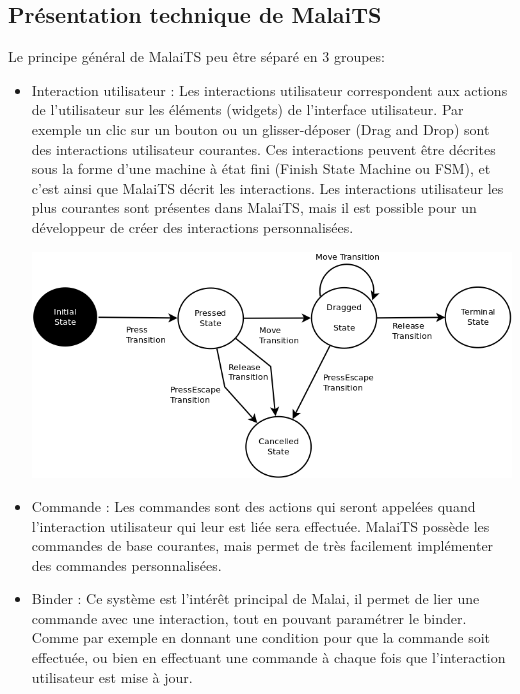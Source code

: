 \documentclass[11pt, a4paper, pdftex]{article}
\begin{document}
    \begin{appendices}
        \section{Présentation technique de MalaiTS}\label{sec:presmalaitech}
            Le principe général de MalaiTS peu être séparé en 3 groupes:
            \begin{itemize}
                \vspace{0.2cm}
                \item Interaction utilisateur : Les interactions utilisateur correspondent aux actions de l'utilisateur sur les éléments (widgets) de l'interface utilisateur.
                Par exemple un clic sur un bouton ou un glisser-déposer (Drag and Drop) sont des interactions utilisateur courantes.
                Ces interactions peuvent être décrites sous la forme d'une machine à état fini (Finish State Machine ou FSM), et c'est ainsi que MalaiTS décrit les interactions.
                Les interactions utilisateur les plus courantes sont présentes dans MalaiTS, mais il est possible pour un développeur de créer des interactions personnalisées. \par
                \vspace{0.5cm}
                    \begin{minipage}{\linewidth}
                        \centering
                        \includegraphics[height=6.0cm]{../assets/DnD.png}
                    \end{minipage}
                \vspace{0.5cm}
                \item Commande : Les commandes sont des actions qui seront appelées quand l'interaction utilisateur qui leur est liée sera effectuée.
                MalaiTS possède les commandes de base courantes, mais permet de très facilement implémenter des commandes personnalisées.
                \vspace{0.2cm}
                \item Binder : Ce système est l'intérêt principal de Malai, il permet de lier une commande avec une interaction, tout en pouvant paramétrer le binder.
                Comme par exemple en donnant une condition pour que la commande soit effectuée, ou bien en effectuant une commande à chaque fois que l'interaction utilisateur est mise à jour.
            \end{itemize}

    \end{appendices}
\end{document}
